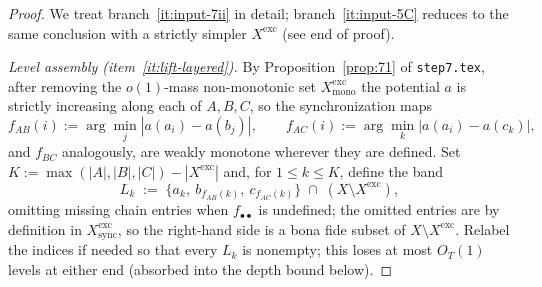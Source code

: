 \begin{proof}
We treat branch~\ref{it:input-7ii} in detail; branch~\ref{it:input-5C}
reduces to the same conclusion with a strictly simpler
$X^{\mathrm{exc}}$ (see end of proof).

\emph{Level assembly (item~\ref{it:lift-layered}).}
By Proposition~\ref{prop:71} of \texttt{step7.tex}, after removing the
$o(1)$-mass non-monotonic set
$X^{\mathrm{exc}}_{\mathrm{mono}}$ the potential $a$ is strictly
increasing along each of $A, B, C$, so the synchronization maps
\[
  f_{AB}(i) := \arg\min_{j}|a(a_i) - a(b_j)|, \qquad
  f_{AC}(i) := \arg\min_{k}|a(a_i) - a(c_k)|,
\]
and $f_{BC}$ analogously, are weakly monotone wherever they are
defined.  Set
$K := \max(|A|, |B|, |C|) - |X^{\mathrm{exc}}|$
and, for $1 \le k \le K$, define the band
\[
  L_k \;:=\;
  \bigl\{a_k,\ b_{f_{AB}(k)},\ c_{f_{AC}(k)}\bigr\}
  \;\cap\; (X \setminus X^{\mathrm{exc}}),
\]
omitting missing chain entries when $f_{\bullet\bullet}$ is
undefined; the omitted entries are by definition in
$X^{\mathrm{exc}}_{\mathrm{sync}}$, so the right-hand side is a bona
fide subset of $X \setminus X^{\mathrm{exc}}$.  Relabel the indices if
needed so that every $L_k$ is nonempty; this loses at most $O_T(1)$
levels at either end (absorbed into the depth bound below).


\end{proof}

